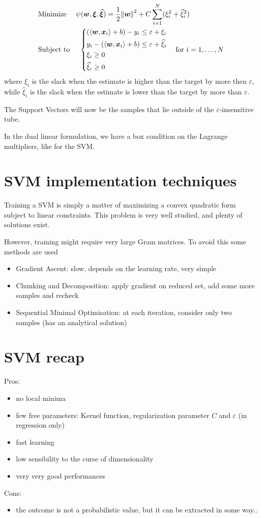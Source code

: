 \documentclass[oneside,onecolumn]{report}
\newcommand{\eps}{\varepsilon}
\newcommand{\inp}[2]{\left\langle #1, #2 \right\rangle}
\begin{document}
\begin{align*}
    &\text{Minimize   } \quad \psi(\bm w, \bm \xi, \widehat {\bm \xi}) = \frac{1}{2} \norm{\bm w}^2 + C \sum_{i = 1}^N (\xi_i^2 + \widehat \xi_i^2) \\
    &\text{Subject to } \quad \begin{dcases}
        (\inp{\bm w}{\bm x_i} + b) - y_i \leq \eps + \xi_i \\
        y_i - (\inp{\bm w}{\bm x_i} + b) \leq \eps + \widehat \xi_i \\
        \xi_i \geq 0 \\
        \widehat \xi_i \geq 0
    \end{dcases} \quad \text{for } i = 1, \dots, N
\end{align*}
where $\xi_i$ is the slack when the estimate is higher than the target by more then $\eps$, while $\widehat \xi_i$ is the slack when the estimate is lower than the target by more than $\eps$.

The Support Vectors will now be the samples that lie outside of the $\eps$-insensitive tube.

In the dual linear formulation, we have a box condition on the Lagrange multipliers, like for the SVM.


\section{SVM implementation techniques}
Training a SVM is simply a matter of maximizing a convex quadratic form subject to linear constraints.
This problem is very well studied, and plenty of solutions exist.

However, training might require very large Gram matrices.
To avoid this some methods are used
\begin{itemize}
    \item Gradient Ascent: slow, depends on the learning rate, very simple
    \item Chunking and Decomposition: apply gradient on reduced set, add some more samples and recheck
    \item Sequential Minimal Optimisation: at each iteration, consider only two samples (has an analytical solution)
\end{itemize}

\section{SVM recap}
Pros:
\begin{itemize}
    \item no local minima
    \item few free parameters: Kernel function, regularization parameter $C$ and $\eps$ (in regression only)
    \item fast learning
    \item low sensibility to the curse of dimensionality
    \item very very good performances
\end{itemize}

Cons:
\begin{itemize}
    \item the outcome is not a probabilistic value, but it can be extracted in some way..
\end{itemize}
\end{document}
